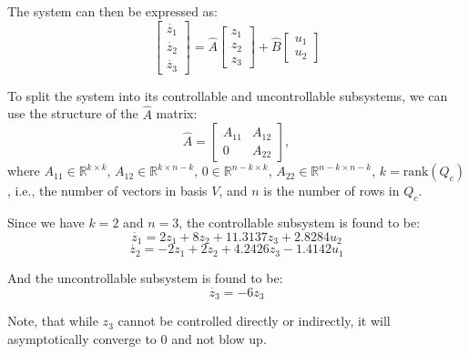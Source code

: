 \documentclass[10pt]{article}
\begin{document}
The system can then be expressed as:
\begin{equation*}
    \begin{bmatrix}
        \dot{z_1} \\
        \dot{z_2} \\
        \dot{z_3}
    \end{bmatrix}
    =
    \hat{A} \begin{bmatrix}
        z_1\\z_2\\z_3
    \end{bmatrix} +
    \hat{B} \begin{bmatrix}
        u_1 \\ u_2
    \end{bmatrix}
\end{equation*}

To split the system into its controllable and uncontrollable subsystems, we can use the structure of the $\hat{A}$ matrix:
\begin{equation*}
    \hat{A} = 
    \begin{bmatrix}
        A_{11} & A_{12}\\
        0 & A_{22}
    \end{bmatrix},
\end{equation*}
where $A_{11} \in \mathbb{R}^{k\times k}$, $A_{12} \in \mathbb{R}^{k \times n-k}$, $0 \in \mathbb{R}^{n-k \times k}$, $A_{22} \in \mathbb{R}^{n-k \times n-k}$, $k = \text{rank}(Q_c)$, i.e., the number of vectors in basis $V$, and $n$ is the number of rows in $Q_c$.

Since we have $k = 2$ and $n = 3$, the controllable subsystem is found to be:
\begin{equation*}
    \dot{z_1} = 2z_1 + 8z_2 + 11.3137z_3 + 2.8284u_2
\end{equation*}
\begin{equation*}
    \dot{z_2} = - 2z_1 + 2z_2 + 4.2426z_3 - 1.4142u_1
\end{equation*}

And the uncontrollable subsystem is found to be:
\begin{equation*}
    \dot{z_3} = -6z_3
\end{equation*}

Note, that while $z_3$ cannot be controlled directly or indirectly, it will asymptotically converge to $0$ and not blow up. 
\end{document}
